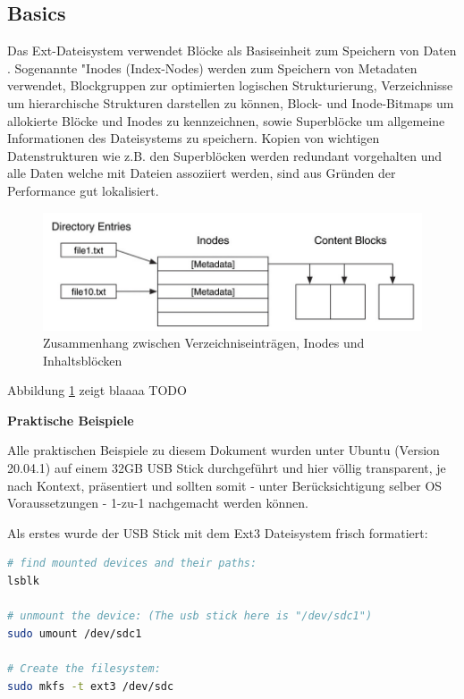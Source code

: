 

\subsection{Basics}

Das Ext-Dateisystem verwendet Blöcke als Basiseinheit zum Speichern von Daten \cite{Ext2.07.01.2022}. Sogenannte "Inodes (Index-Nodes) werden zum Speichern von Metadaten verwendet, Blockgruppen zur optimierten logischen Strukturierung, Verzeichnisse um hierarchische Strukturen darstellen zu können, Block- und Inode-Bitmaps um allokierte Blöcke und Inodes zu kennzeichnen, sowie Superblöcke um allgemeine Informationen des Dateisystems zu speichern. Kopien von wichtigen Datenstrukturen wie z.B. den Superblöcken werden redundant vorgehalten und alle Daten welche mit Dateien assoziiert werden, sind aus Gründen der Performance gut lokalisiert\cite{Carrier.06.01.2022}.

\begin{figure}[H]
	\centering
	\includegraphics[width=12cm,keepaspectratio=true]{pictures/ext1.png}
	\caption{
		Zusammenhang zwischen Verzeichniseinträgen, Inodes und Inhaltsblöcken \cite{Carrier.06.01.2022}
	}
	\label{fig:ext2}
\end{figure}

Abbildung \ref{fig:ext2} zeigt blaaaa TODO



\textbf{Praktische Beispiele}

Alle praktischen Beispiele zu diesem Dokument wurden unter Ubuntu (Version 20.04.1) auf einem 32GB USB Stick durchgeführt und hier völlig transparent, je nach Kontext, präsentiert und sollten somit - unter Berücksichtigung selber OS Voraussetzungen - 1-zu-1 nachgemacht werden können. 

Als erstes wurde der USB Stick mit dem Ext3 Dateisystem frisch formatiert:

\begin{lstlisting}[language=bash,caption={Create the FS}]
# find mounted devices and their paths:
lsblk

# unmount the device: (The usb stick here is "/dev/sdc1")
sudo umount /dev/sdc1

# Create the filesystem:
sudo mkfs -t ext3 /dev/sdc
\end{lstlisting}  

